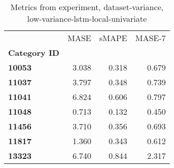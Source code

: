 \begin{table}[h]
\centering
\caption{Metrics from experiment, dataset-variance, low-variance-lstm-local-univariate}
\label{table:low-variance-lstm-local-univariate-dataset-variance}
\begin{tabular}{lrrr}
\toprule
{} &   MASE &  sMAPE &  MASE-7 \\
\textbf{Category ID} &        &        &         \\
\midrule
\textbf{10053      } &  3.038 &  0.318 &   0.679 \\
\textbf{11037      } &  3.797 &  0.348 &   0.739 \\
\textbf{11041      } &  6.824 &  0.606 &   0.797 \\
\textbf{11048      } &  0.713 &  0.132 &   0.450 \\
\textbf{11456      } &  3.710 &  0.356 &   0.693 \\
\textbf{11817      } &  1.360 &  0.343 &   0.612 \\
\textbf{13323      } &  6.740 &  0.844 &   2.317 \\
\bottomrule
\end{tabular}
\end{table}
